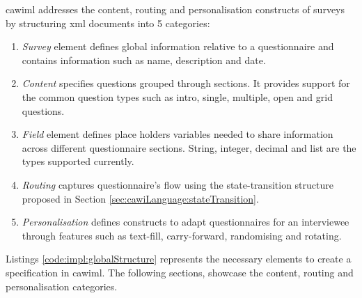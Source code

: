 	\gls{cawiml} addresses the content, routing and personalisation constructs of surveys by structuring \gls{xml} documents into 5 categories:

	\begin{enumerate}
		\item \emph{Survey} element defines global information relative to a questionnaire and contains information such as name, description and date.
		\item \emph{Content} specifies questions grouped through sections. It provides support for the common question types such as intro, single, multiple, open and grid questions.
		\item \emph{Field} element defines place holders variables needed to share information across different questionnaire sections. String, integer, decimal and list are the types supported currently.
		\item \emph{Routing} captures questionnaire's flow using the state-transition structure proposed in Section \ref{sec:cawiLanguage:stateTransition}.
		\item \emph{Personalisation} defines constructs to adapt questionnaires for an interviewee through features such as text-fill, carry-forward, randomising and rotating.
	\end{enumerate}

	Listings \ref{code:impl:globalStructure} represents the necessary elements to create a specification in \gls{cawiml}. The following sections, showcase the content, routing and personalisation categories.

	


	